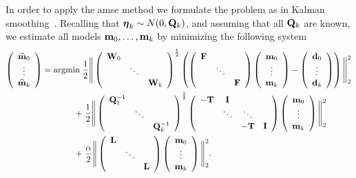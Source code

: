 \documentclass[11pt]{article}
\newcommand{\bfF}	{{\bf{F}}}
\newcommand{\bfI}	{{\bf{I}}}
\newcommand{\bfL}	{{\bf{L}}}
\newcommand{\bfQ}	{{\bf{Q}}}
\newcommand{\bfT}	{{\bf{T}}}
\newcommand{\bfW}	{{\bf{W}}}
\newcommand{\bfd}	{{\bf{d}}}
\newcommand{\bfm}	{{\bf{m}}}
\newcommand{\hf}        {{\frac 12}}
\newcommand{\bfeta}     {{\boldsymbol \eta}}
\renewcommand{\hf}		 {\frac12}
\newcommand{\bfmhat}    {{\widehat{\bfm}}}
\begin{document}
In order to apply the amse method we formulate the problem as in Kalman smoothing~\cite{kalman1960,Aravkin2013}. Recalling that  $\bfeta_k \sim N(0,\bfQ_k)$, and assuming that all $\bfQ_k$ are known, we estimate all models $\bfm_0, \hdots, \bfm_k$ by minimizing the following system 
\begin{align}
\left(\begin{array}{c}  \bfmhat_0  \\ \vdots \\ \bfmhat_k\end{array}\right)
={\rm argmin }\;
& \hf \Bigg\|
\left(\begin{array}{ccc}\bfW_0 & &  \\ & \ddots &  \\  &  & \bfW_k \end{array}\right)^{\hf}	
\left(
\left(\begin{array}{ccc}\bfF & &  \\    & \ddots & \\ & & \bfF \end{array}\right)	
\left(\begin{array}{c}  \bfm_0  \\ \vdots \\ \bfm_k\end{array}\right) -
\left(\begin{array}{c} \bfd_0   \\ \vdots \\ \bfd_k\end{array}\right)
\right)\Bigg\|^2_2\\
\nonumber
 + 
& \;\hf \Bigg\|
\left(\begin{array}{ccc}\bfQ^{-1}_1 &  \\ & \ddots  \\ & &\bfQ^{-1}_k \end{array}\right)^{\hf}
\left( \begin{array}{cccc} -\bfT & \bfI &   \\  & \ddots & \ddots\\ & &   -\bfT & \bfI  \end{array}\right)
\left(\begin{array}{c}  \bfm_0  \\ \vdots \\ \bfm_k \end{array}\right)\Bigg\|^2_2\\
 + & \;{\frac \alpha 2}\Bigg\|
\left(\begin{array}{ccc}\bfL &  \\ & \ddots  \\ & &\bfL\end{array}\right)
\left(\begin{array}{c}  \bfm_0  \\ \vdots \\ \bfm_k \end{array}\right)\Bigg\|^2_2. 
\end{align}
\end{document}
